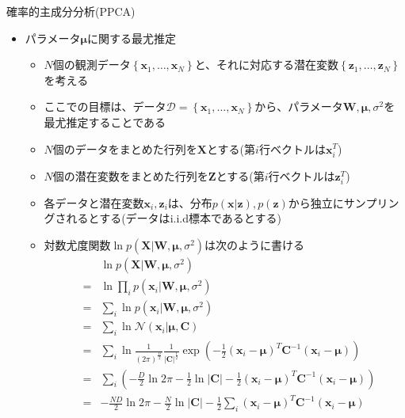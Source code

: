 \documentclass[dvipdfmx,notheorems,t]{beamer}
\begin{document}
\begin{frame}{確率的主成分分析(PPCA)}

\begin{itemize}
	\item パラメータ$\bm{\mu}$に関する最尤推定
	\begin{itemize}
		\item $N$個の観測データ$\left\{ \bm{x}_1, \ldots, \bm{x}_N \right\}$と、それに対応する潜在変数$\left\{ \bm{z}_1, \ldots, \bm{z}_N \right\}$を考える
		\item ここでの目標は、データ$\mathcal{D} = \left\{ \bm{x}_1, \ldots, \bm{x}_N \right\}$から、パラメータ$\bm{W}, \bm{\mu}, \sigma^2$を最尤推定することである
		\newline
		
		\item $N$個のデータをまとめた行列を$\bm{X}$とする(第$i$行ベクトルは$\bm{x}_i^T$)
		\item $N$個の潜在変数をまとめた行列を$\bm{Z}$とする(第$i$行ベクトルは$\bm{z}_i^T$)
		\newline
		
		\item 各データと潜在変数$\bm{x}_i, \bm{z}_i$は、分布$p(\bm{x} | \bm{z}), p(\bm{z})$から独立にサンプリングされるとする(データは\alert{i.i.d標本}であるとする)
		\newline
		
		\item 対数尤度関数$\ln p(\bm{X} | \bm{W}, \bm{\mu}, \sigma^2)$は次のように書ける
		\begin{eqnarray}
			&& \ln p(\bm{X} | \bm{W}, \bm{\mu}, \sigma^2) \nonumber \\
			&=& \ln \prod_i p(\bm{x}_i | \bm{W}, \bm{\mu}, \sigma^2) \nonumber \\
			&=& \sum_i \ln p(\bm{x}_i | \bm{W}, \bm{\mu}, \sigma^2) \nonumber \\
			&=& \sum_i \ln \mathcal{N}(\bm{x}_i | \bm{\mu}, \bm{C}) \nonumber \\
			&=& \sum_i \ln \frac{1}{(2\pi)^\frac{D}{2}} \frac{1}{|\bm{C}|^\frac{1}{2}} \exp \left( -\frac{1}{2} \left( \bm{x}_i - \bm{\mu} \right)^T \bm{C}^{-1} \left( \bm{x}_i - \bm{\mu} \right) \right) \nonumber \\
			&=& \sum_i \left( -\frac{D}{2} \ln 2\pi - \frac{1}{2} \ln |\bm{C}| - \frac{1}{2} \left( \bm{x}_i - \bm{\mu} \right)^T \bm{C}^{-1} \left( \bm{x}_i - \bm{\mu} \right) \right) \nonumber \\
			&=& -\frac{ND}{2} \ln 2\pi - \frac{N}{2} \ln |\bm{C}| - \frac{1}{2} \sum_i \left( \bm{x}_i - \bm{\mu} \right)^T \bm{C}^{-1} \left( \bm{x}_i - \bm{\mu} \right) \nonumber
		\end{eqnarray}
		

\end{itemize}
\end{itemize}
\end{frame}
\end{document}
